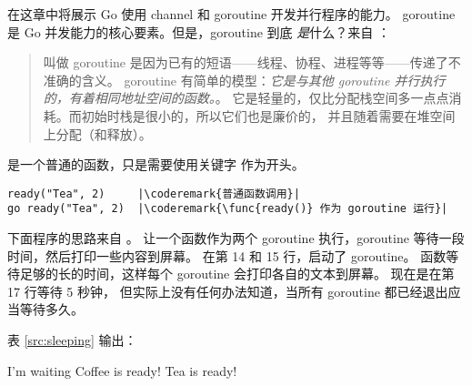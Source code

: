 \noindent{}在这章中将展示 Go 使用 channel 和 goroutine 开发并行程序的能力。
goroutine 是 Go 并发能力的核心要素。但是，goroutine 到底 \emph{是}什么？来自
\cite{effective_go}：
\begin{quote}
叫做 goroutine 是因为已有的短语——线程、协程、进程等等——传递了不准确的含义。
goroutine 有简单的模型：\emph{它是与其他 goroutine 并行执行的，有着相同地址空间的函数。}。
它是轻量的，仅比分配栈空间多一点点消耗。而初始时栈是很小的，所以它们也是廉价的，
并且随着需要在堆空间上分配（和释放）。
\end{quote}
 是一个普通的函数，只是需要使用关键字
 作为开头。
\begin{lstlisting}
ready("Tea", 2)	    |\coderemark{普通函数调用}|
go ready("Tea", 2)  |\coderemark{\func{ready()} 作为 goroutine 运行}|
\end{lstlisting}
下面程序的思路来自 \cite{go_course_day3}。
让一个函数作为两个 goroutine 执行，goroutine 等待一段时间，然后打印一些内容到屏幕。
在第 14 和 15 行，启动了 goroutine。
 函数等待足够的长的时间，这样每个 goroutine 会打印各自的文本到屏幕。
现在是在第 17 行等待 5 秒钟，
但实际上没有任何办法知道，当所有 goroutine 都已经退出应当等待多久。 

表 \ref{src:sleeping} 输出：
\begin{display}
I'm waiting         
Coffee is ready!    
Tea is ready!       
\end{display}

